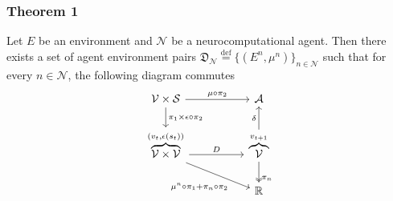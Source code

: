 \documentclass{beamer}
\numberwithin{equation}{subsection}
\numberwithin{theorem}{subsection}
\def\reals{{\mathbb R}}
\def\defeq{\stackrel{\text{def}}{=}}
\def\scriptv{{\mathcal V}}
\def\scripta{{\mathcal A}}
\def\scriptn{{\mathcal N}}
\def\scripts{{\mathcal S}}
\begin{document}
\begin{frame}[fragile]
    \frametitle{Theorem 1}
    \begin{theorem}\label{thm:ncomp}
      Let $E$ be an environment and $\scriptn$ be a neurocomputational agent. Then there exists a set of agent environment pairs $\mathfrak{D}_\scriptn \defeq \{(E^n, \mu^n)\}_{n\in \scriptn}$ such that for every $n \in \scriptn$, the following diagram commutes
        \begin{equation}\label{eq:sub_env_com}
            \begin{tikzcd} %
          \scriptv  \times \scripts \arrow{r}{\mu\circ\pi_2}
               \arrow{d}
                 {\pi_1  \times\epsilon \circ \pi_2}  &[+25pt]  \scripta    \\
            \overbrace{\scriptv \times \scriptv}^{(v_{t},\epsilon(s_t))}
                        \arrow{r}{D}
                                    \arrow[pos = 0.7]{rd}[swap]{\mu^n\circ\pi_1 + \pi_n \circ \pi_2}
                        & \overbrace{\scriptv}^{v_{t+1}}
                                              \arrow[two heads, pos=0.8]
                                                {d}
                                                {\pi_n}
                                              \arrow{u}{\delta} \\
    &\reals
           \end{tikzcd}
        \end{equation}
    \end{theorem}
\end{frame}
\end{document}
